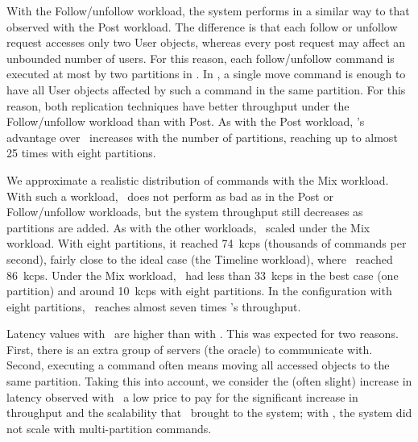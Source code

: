 With the Follow/unfollow workload, the system performs in a similar way to that observed with the Post workload.
The difference is that each follow or unfollow request accesses only two User objects, whereas every post request may affect an unbounded number of users.
For this reason, each follow/unfollow command is executed at most by two partitions in \ssmr{}.
In \dssmr{}, a single move command is enough to have all User objects affected by such a command in the same partition.
For this reason, both replication techniques have better throughput under the Follow/unfollow workload than with Post.
As with the Post workload, \dssmr{}'s advantage over \ssmr\ increases with the number of partitions, reaching up to almost 25 times with eight partitions.

We approximate a realistic distribution of commands with the Mix workload.
With such a workload, \ssmr\ does not perform as bad as in the Post or Follow/unfollow workloads, but the system throughput still decreases as partitions are added.
As with the other workloads, \dssmr\ scaled under the Mix workload.
With eight partitions, it reached 74~kcps (thousands of commands per second), fairly close to the ideal case (the Timeline workload), where \dssmr\ reached 86~kcps.
Under the Mix workload, \ssmr\ had less than 33~kcps in the best case (one partition) and around 10~kcps with eight partitions.
In the configuration with eight partitions, \dssmr\ reaches almost seven times \ssmr's throughput.

Latency values with \dssmr\ are higher than with \ssmr{}.
This was expected for two reasons. First, there is an extra group of servers (the oracle) to communicate with.
Second, executing a command often means moving all accessed objects to the same partition.
Taking this into account, we consider the (often slight) increase in latency observed with \dssmr\ a low price to pay for the significant increase in throughput and the scalability that \dssmr\ brought to the system; with \ssmr{}, the system did not scale with multi-partition commands.



